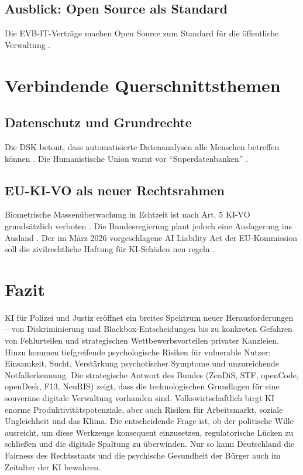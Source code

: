 \documentclass[12pt,a4paper]{article}
\begin{document}
	\subsection{Ausblick: Open Source als Standard}
	
	Die EVB-IT-Verträge machen Open Source zum Standard für die öffentliche Verwaltung \cite{ZenDiS2025}.
	
	\section{Verbindende Querschnittsthemen}
	
	\subsection{Datenschutz und Grundrechte}
	
	Die DSK betont, dass automatisierte Datenanalysen alle Menschen betreffen können \cite{DSK2025}. Die Humanistische Union warnt vor \enquote{Superdatenbanken} \cite{HumanUnion2025}.
	
	\subsection{EU-KI-VO als neuer Rechtsrahmen}
	
	Biometrische Massenüberwachung in Echtzeit ist nach Art. 5 KI-VO grundsätzlich verboten \cite{RAV2025}. Die Bundesregierung plant jedoch eine Auslagerung ins Ausland \cite{Gruene2026}. Der im März 2026 vorgeschlagene AI Liability Act der EU-Kommission soll die zivilrechtliche Haftung für KI-Schäden neu regeln \cite{EUAILiability2026}.
	
	\section{Fazit}
	
	KI für Polizei und Justiz eröffnet ein breites Spektrum neuer Herausforderungen – von Diskriminierung und Blackbox-Entscheidungen bis zu konkreten Gefahren von Fehlurteilen und strategischen Wettbewerbsvorteilen privater Kanzleien. Hinzu kommen tiefgreifende psychologische Risiken für vulnerable Nutzer: Einsamkeit, Sucht, Verstärkung psychotischer Symptome und unzureichende Notfallerkennung. Die strategische Antwort des Bundes (ZenDiS, STF, openCode, openDesk, F13, NeuRIS) zeigt, dass die technologischen Grundlagen für eine souveräne digitale Verwaltung vorhanden sind. Volkswirtschaftlich birgt KI enorme Produktivitätspotenziale, aber auch Risiken für Arbeitsmarkt, soziale Ungleichheit und das Klima. Die entscheidende Frage ist, ob der politische Wille ausreicht, um diese Werkzeuge konsequent einzusetzen, regulatorische Lücken zu schließen und die digitale Spaltung zu überwinden. Nur so kann Deutschland die Fairness des Rechtsstaats und die psychische Gesundheit der Bürger auch im Zeitalter der KI bewahren.
	
\end{document}
